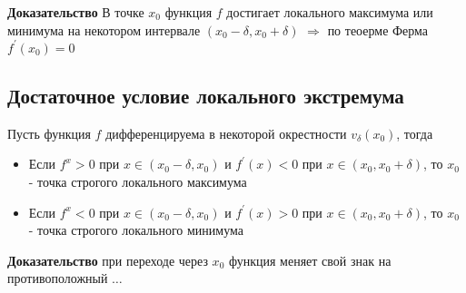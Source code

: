 \documentclass[class=article,a4paper,12pt,crop=false]{standalone}
\begin{document}
\textbf{Доказательство} В точке $x_0$ функция $f$ достигает локального максимума или минимума на 
некотором интервале $(x_0 - \delta, x_0 + \delta)$ $\Rightarrow$ по теоерме Ферма $f^{'}(x_0) = 0$

\subsection{Достаточное условие локального экстремума}

Пусть функция $f$ дифференцируема в некоторой окрестности $v_{\delta}(x_0)$, тогда
\begin{itemize}
    \item {
        Если $f^{x} > 0$ при $x \in (x_0 - \delta, x_0)$ и $f^{'}(x) < 0$ при $x \in (x_0, x_0 + \delta)$,
        то $x_0$ - точка строгого локального максимума
    }
    \item {
        Если $f^{x} < 0$ при $x \in (x_0 - \delta, x_0)$ и $f^{'}(x) > 0$ при $x \in (x_0, x_0 + \delta)$,
        то $x_0$ - точка строгого локального минимума
    }
\end{itemize}

\textbf{Доказательство} при переходе через $x_0$ функция меняет свой знак на противоположный $\dots$
\end{document}
